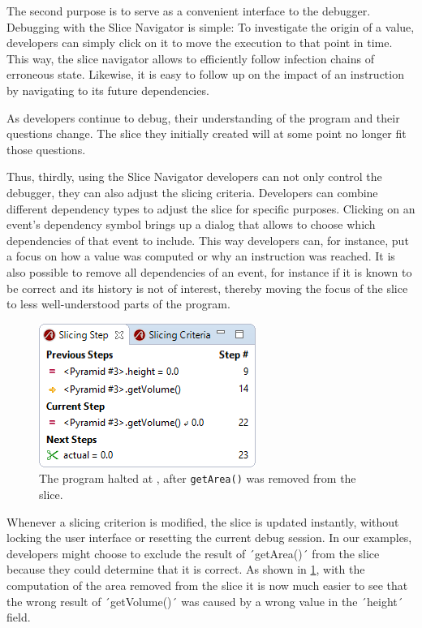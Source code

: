The second purpose is to serve as a convenient interface to the debugger.
Debugging with the Slice Navigator is simple:
To investigate the origin of a value, developers can simply click on it to move the execution to that point in time.
This way, the slice navigator allows to efficiently follow infection chains of erroneous state.
Likewise, it is easy to follow up on the impact of an instruction by navigating to its future dependencies.

As developers continue to debug, their understanding of the program and their questions change.
The slice they initially created will at some point no longer fit those questions.

Thus, thirdly, using the Slice Navigator developers can not only control the debugger, they can also adjust the slicing criteria.
Developers can combine different dependency types to adjust the slice for specific purposes.
Clicking on an event's dependency symbol brings up a dialog that allows to choose which dependencies of that event to include.
This way developers can, for instance, put a focus on how a value was computed or why an instruction was reached.
It is also possible to remove all dependencies of an event, for instance if it is known to be correct and its history is not of interest, thereby moving the focus of the slice to less well-understood parts of the program.

\begin{figure}
	\centering
		\includegraphics[width=0.40\linewidth]{img/slice2.png}
	\caption{The program halted at , after \lstinline{getArea()} was removed from the slice.}
	\label{fig:slice2}
\end{figure}

Whenever a slicing criterion is modified, the slice is updated instantly, without locking the user interface or resetting the current debug session.
In our examples, developers might choose to exclude the result of ´getArea()´ from the slice because  they could determine that it is correct.
As shown in \cref{fig:slice2}, with the computation of the area removed from the slice it is now much easier to see that the wrong result of ´getVolume()´ was caused by a wrong value in the ´height´ field.

